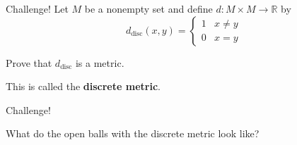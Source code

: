 \documentclass{beamer}
\begin{document}
\begin{frame}{Challenge!}
Let $M$ be a nonempty set and define $d: M\times M\rightarrow \mathbb{R}$ by
$$d_{\text{disc}}(x,y) = \left\lbrace\begin{array}{cc}
1 &  x\neq y\\
0 &  x = y
\end{array}\right.$$
\pause
\begin{prob}
Prove that $d_{\text{disc}}$ is a metric.
\end{prob}
\pause
This is called the \textbf{discrete metric}.
\end{frame}

\begin{frame}{Challenge!}
\begin{prob}
What do the open balls with the discrete metric look like?
\end{prob}
\end{frame}
\end{document}
